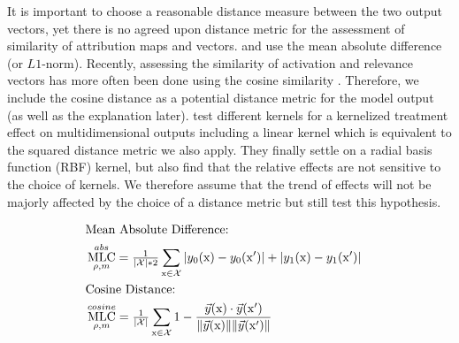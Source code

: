 It is important to choose a reasonable distance measure between the two output vectors, yet there is no agreed upon distance metric for the assessment of similarity of attribution maps and vectors. \citeauthor{Sixt2022a} and \citeauthor{Goyal2019} use the mean absolute difference (or $L1$-norm). 
Recently, assessing the similarity of activation and relevance vectors has more often been done using the cosine similarity \citep{Sixt2020,Achtibat2023,Dreyer2023a, Pahde2023}. Therefore, we include the cosine distance as a potential distance metric for the model output (as well as the explanation later). \citeauthor{Karimi2023} test different kernels for a kernelized treatment effect on multidimensional outputs including a linear kernel which is equivalent to the squared distance metric we also apply. They finally settle on a radial basis function (RBF) kernel, but also find that the relative effects are not sensitive to the choice of kernels. 
We therefore assume that the trend of effects will not be majorly affected by the choice of a distance metric but still test this hypothesis.


\begin{align}\displaystyle 
& \text{Mean Absolute Difference:} & \notag \\
& \operatorname*{MLC}_{\rho, m}^{abs} = \tfrac{1}{|\mathcal{X}| * 2} \sum_{\mathrm{x} \in \mathcal{X}} 
|y_0(\mathrm{x}) -y_0(\mathrm{x'})| + |y_1(\mathrm{x}) -y_1(\mathrm{x'})| \\
& \text{Cosine Distance:} &  \notag \\
& \operatorname*{MLC}_{\rho, m}^{cosine} = \tfrac{1}{|\mathcal{X}|}\sum_{\mathrm{x} \in \mathcal{X}}  
1 - \frac{\vec{y}(\mathrm{x}) \cdot \vec{y}(\mathrm{x'})}
{\lVert \vec{y}(\mathrm{x}) \rVert \lVert \vec{y}(\mathrm{x'})\rVert }
\end{align}


